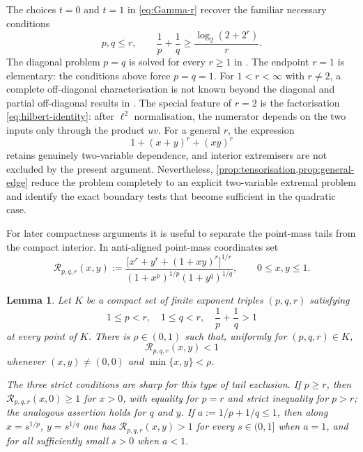 \documentclass[11pt,reqno]{amsart}
\numberwithin{equation}{section}
\newtheorem{lemma}[lemma]{Lemma}
\theoremstyle{definition}
\theoremstyle{remark}
\newcommand{\logtwo}{\log_2}
\begin{document}
The choices $t=0$ and $t=1$ in \eqref{eq:Gamma-r} recover the familiar necessary conditions
\[
  p,q\le r,
  \qquad
  \frac1p+\frac1q
  \ge\frac{\logtwo(2+2^r)}r.
\]
The diagonal problem $p=q$ is solved for every $r\ge1$ in \cite{BIMP,CKS}.  The endpoint $r=1$ is elementary: the conditions above force $p=q=1$.  For $1<r<\infty$ with $r\ne2$, a complete off-diagonal characterisation is not known beyond the diagonal and partial off-diagonal results in \cite{BIMP,CKS}.  The special feature of $r=2$ is the factorisation \eqref{eq:hilbert-identity}: after $\ell^2$ normalisation, the numerator depends on the two inputs only through the product $uv$.  For a general $r$, the expression
\[
  1+(x+y)^r+(xy)^r
\]
retains genuinely two-variable dependence, and interior extremisers are not excluded by the present argument.  Nevertheless, \cref{prop:tensorisation,prop:general-edge} reduce the problem completely to an explicit two-variable extremal problem and identify the exact boundary tests that become sufficient in the quadratic case.

For later compactness arguments it is useful to separate the point-mass tails
from the compact interior.  In anti-aligned point-mass coordinates set
\begin{equation}\label{eq:point-mass-ratio}
  \mathcal R_{p,q,r}(x,y)
  :=
  \frac{\bigl[x^r+y^r+(1+xy)^r\bigr]^{1/r}}
  {(1+x^p)^{1/p}(1+y^q)^{1/q}},
  \qquad 0\le x,y\le1.
\end{equation}

\begin{lemma}
\label{lem:tail-exclusion}
Let $K$ be a compact set of finite exponent triples $(p,q,r)$ satisfying
\begin{equation}\label{eq:tail-strict-conditions}
  1\le p<r,\quad 1\le q<r,\quad \frac1p+\frac1q>1
\end{equation}
at every point of $K$.  There is $\rho\in(0,1)$ such that, uniformly for
$(p,q,r)\in K$,
\[
  \mathcal R_{p,q,r}(x,y)<1
\]
whenever $(x,y)\ne(0,0)$ and $\min\{x,y\}<\rho$.

The three strict conditions are sharp for this type of tail exclusion.  If
$p\ge r$, then $\mathcal R_{p,q,r}(x,0)\ge1$ for $x>0$, with equality for
$p=r$ and strict inequality for $p>r$; the analogous assertion holds for
$q$ and $y$.  If $a:=1/p+1/q\le1$, then along
$x=s^{1/p}$, $y=s^{1/q}$ one has $\mathcal R_{p,q,r}(x,y)>1$ for every
$s\in(0,1]$ when $a=1$, and for all sufficiently small $s>0$ when $a<1$.
\end{lemma}
\end{document}
